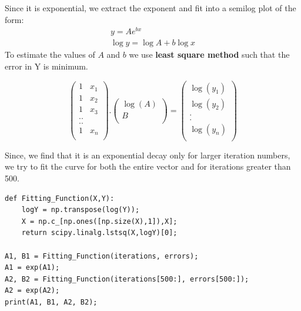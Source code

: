 \documentclass[12pt, a4paper]{report}
\begin{document}
Since it is exponential, we extract the exponent and fit into a semilog plot of the form:
\begin{align*}
y = Ae^{bx} \\
\log y = \log A + b\log x
\end{align*}
 To estimate the values of $A$ and $b$ we use \textbf{least square method} such that the error in Y is minimum. 

\begin{equation*}
\begin{pmatrix}
1 & x_1\\
1 & x_2\\
1 & x_3\\
.  .\\
.  .\\
1 & x_n\\
\end{pmatrix}
.
\begin{pmatrix}
\log(A)\\
B\\
\end{pmatrix}
=
\begin{pmatrix}
\log(y_1)\\
\log(y_2)\\
.\\
.\\
\log(y_n)\\
\end{pmatrix}
\end{equation*}



Since, we find that it is an exponential decay only for larger iteration numbers, we try to fit the curve for both the entire vector and for iterations greater than 500.
\begin{verbatim}
def Fitting_Function(X,Y):
    logY = np.transpose(log(Y));
    X = np.c_[np.ones([np.size(X),1]),X];
    return scipy.linalg.lstsq(X,logY)[0];   

A1, B1 = Fitting_Function(iterations, errors);
A1 = exp(A1);
A2, B2 = Fitting_Function(iterations[500:], errors[500:]);
A2 = exp(A2);
print(A1, B1, A2, B2);
\end{verbatim}
\end{document}
